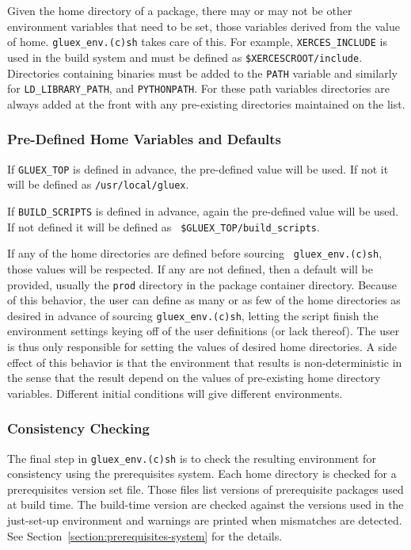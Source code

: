 \documentclass[12pt, letterpaper]{article}
\begin{document}
Given the home directory of a package, there may or may not be other
environment variables that need to be set, those variables derived
from the value of home. {\tt gluex\_env.(c)sh} takes care of this. For
example, {\tt XERCES\_INCLUDE} is used in the build system and must be
defined as {\tt \$XERCESCROOT/include}. Directories containing
binaries must be added to the {\tt PATH} variable and similarly for
{\tt LD\_LIBRARY\_PATH}, and {\tt PYTHONPATH}. For these path
variables directories are always added at the front with any
pre-existing directories maintained on the list.

\subsubsection{Pre-Defined Home Variables and Defaults}

If {\tt GLUEX\_TOP} is defined in advance, the pre-defined value will
be used. If not it will be defined as {\tt /usr/local/gluex}.

If {\tt BUILD\_SCRIPTS} is defined in advance, again the pre-defined
value will be used. If not defined it will be defined as {\tt
  \$GLUEX\_TOP/build\_scripts}.

If any of the home directories are defined before sourcing {\tt
  gluex\_env.(c)sh}, those values will be respected. If any are not
defined, then a default will be provided, usually the {\tt prod}
directory in the package container directory. Because of this
behavior, the user can define as many or as few of the home
directories as desired in advance of sourcing {\tt gluex\_env.(c)sh},
letting the script finish the environment settings keying off of the
user definitions (or lack thereof). The user is thus only responsible
for setting the values of desired home directories. A side effect of
this behavior is that the environment that results is
non-deterministic in the sense that the result depend on the values
of pre-existing home directory variables. Different initial conditions
will give different environments.

\subsubsection{Consistency Checking}

The final step in {\tt gluex\_env.(c)sh} is to check the resulting
environment for consistency using the prerequisites system. Each home
directory is checked for a prerequisites version set file. Those files
list versions of prerequisite packages used at build time. The
build-time version are checked against the versions used in the
just-set-up environment and warnings are printed when mismatches are
detected. See Section~\ref{section:prerequisites-system} for the
details.
\end{document}
